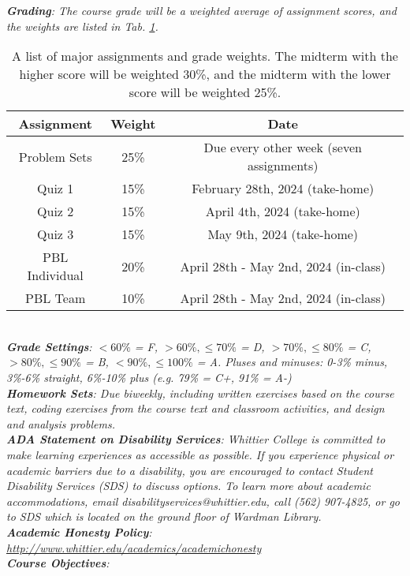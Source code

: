 \documentclass[10pt]{article}
\begin{document}
\textit{\textbf{Grading}: The course grade will be a weighted average of assignment scores, and the weights are listed in Tab. \ref{tab:grading}.}
\begin{table}[hb]
\centering
\begin{tabular}{| c | c | c |}
\hline
\textbf{Assignment} & \textbf{Weight} & \textbf{Date} \\ \hline
Problem Sets & 25\% & Due every other week (seven assignments) \\ \hline
Quiz 1 & 15\% & February 28th, 2024 (take-home) \\ \hline
Quiz 2 & 15\% & April 4th, 2024 (take-home) \\ \hline
Quiz 3 & 15\% & May 9th, 2024 (take-home) \\ \hline
PBL Individual & 20\% & April 28th - May 2nd, 2024 (in-class) \\ \hline
PBL Team & 10\% & April 28th - May 2nd, 2024 (in-class) \\ \hline
\end{tabular}
\caption{\label{tab:grading} A list of major assignments and grade weights.  The midterm with the higher score will be weighted 30\%, and the midterm with the lower score will be weighted 25\%.}
\end{table} \\
\textit{\textbf{Grade Settings}: $<60\%$ = F, $>60\%,\leq 70\%$ = D, $>70\%,\leq80\%$ = C, $>80\%,\leq 90\%$ = B, $<90\%,\leq 100\%$ = A.  Pluses and minuses: 0-3\% minus, 3\%-6\% straight, 6\%-10\% plus (e.g. 79\% = C+, 91\% = A-)} \\
\textit{\textbf{Homework Sets}: Due biweekly, including written exercises based on the course text, coding exercises from the course text and classroom activities, and design and analysis problems.} \\
\textit{\textbf{ADA Statement on Disability Services}: Whittier College is committed to make learning experiences as accessible as possible. If you experience physical or academic barriers due to a disability, you are encouraged to contact Student Disability Services (SDS) to discuss options. To learn more about academic accommodations, email disabilityservices@whittier.edu, call (562) 907-4825, or go to SDS which is located on the ground floor of Wardman Library.} \\
\textit{\textbf{Academic Honesty Policy}: \url{http://www.whittier.edu/academics/academichonesty}} \\
\textit{\textbf{Course Objectives}:}
\end{document}
